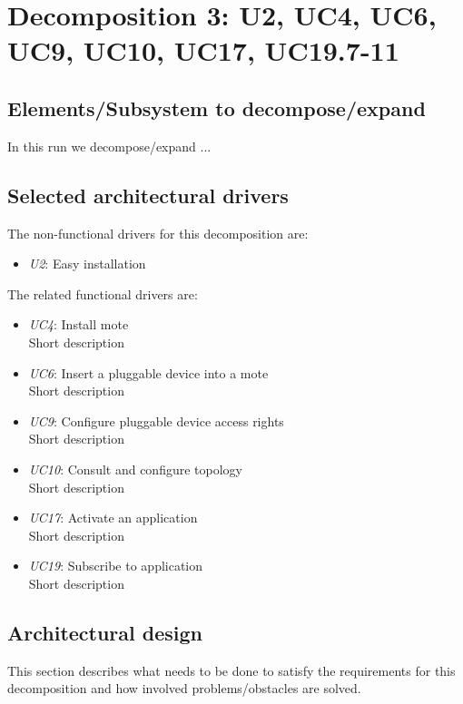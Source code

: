 \section{Decomposition 3: U2, UC4, UC6, UC9, UC10, UC17, UC19.7-11}

\subsection{Elements/Subsystem to decompose/expand}
    In this run we decompose/expand ...


\subsection{Selected architectural drivers}
    The non-functional drivers for this decomposition are:
    \begin{itemize}
    	\item \emph{U2}: Easy installation
    \end{itemize}

    The related functional drivers are:
    \begin{itemize}
        \item \emph{UC4}: Install mote \\
              Short description
        \item \emph{UC6}: Insert a pluggable device into a mote \\
              Short description
        \item \emph{UC9}: Configure pluggable device access rights \\
              Short description
        \item \emph{UC10}: Consult and configure topology \\
              Short description
        \item \emph{UC17}: Activate an application \\
              Short description
        \item \emph{UC19}: Subscribe to application \\
              Short description
    \end{itemize}


\subsection{Architectural design}
    This section describes what needs to be done to satisfy the requirements for
    this decomposition and how involved problems/obstacles are solved.

